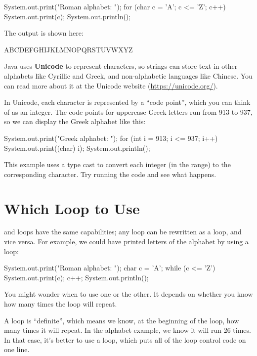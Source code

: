 \begin{code}
System.out.print("Roman alphabet: ");
for (char c = 'A'; c <= 'Z'; c++) {
    System.out.print(c);
}
System.out.println();
\end{code}

The output is shown here:

\begin{stdout}
ABCDEFGHIJKLMNOPQRSTUVWXYZ
\end{stdout}


Java uses {\bf Unicode} to represent characters, so strings can store text in other alphabets like Cyrillic and Greek, and non-alphabetic languages like Chinese.
You can read more about it at the Unicode website (\url{https://unicode.org/}).

In Unicode, each character is represented by a ``code point'', which you can think of as an integer.
The code points for uppercase Greek letters run from 913 to 937, so we can display the Greek alphabet like this:

\begin{code}
System.out.print("Greek alphabet: ");
for (int i = 913; i <= 937; i++) {
    System.out.print((char) i);
}
System.out.println();
\end{code}

This example uses a type cast to convert each integer (in the range) to the corresponding character.
Try running the code and see what happens.


\section{Which Loop to Use}

 and  loops have the same capabilities; any  loop can be rewritten as a  loop, and vice versa.
For example, we could have printed letters of the alphabet by using a  loop:

\begin{code}
System.out.print("Roman alphabet: ");
char c = 'A';
while (c <= 'Z') {
    System.out.print(c);
    c++;
}
System.out.println();
\end{code}

You might wonder when to use one or the other.  It depends on whether you know how many times the loop will repeat.

A  loop is ``definite'', which means we know, at the beginning of the loop, how many times it will repeat.
In the alphabet example, we know it will run 26 times.
In that case, it's better to use a  loop, which puts all of the loop control code on one line.

